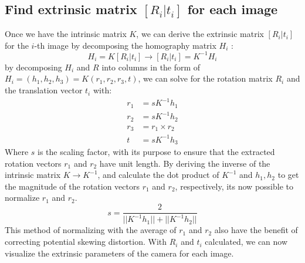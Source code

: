 \documentclass[12pt,letterpaper]{article}
\begin{document}
\subsection{Find extrinsic matrix $[R_i|t_i]$ for each image}
Once we have the intrinsic matrix $K$, we can derive the extrinsic matrix $[R_i|t_i]$ for the $i$-th image by decomposing the homography matrix $H_i$ :
\begin{equation}
    H_i = K[R_i|t_i] \rightarrow [R_i|t_i] = K^{-1}H_i
\end{equation}
by decomposing $H_i$ and $R$ into columns in the form of $H_i = (h_1, h_2, h_3) = K(r_1, r_2, r_3, t)$,
we can solve for the rotation matrix $R_i$ and the translation vector $t_i$ with:
\begin{equation}
    \begin{aligned}
        r_1 & = sK^{-1}h_1 \\ r_2 & = sK^{-1}h_2 \\ r_3 & = r_1 \times r_2 \\ t & = sK^{-1}h_3
    \end{aligned}
\end{equation}
Where $s$ is the scaling factor, with its purpose to ensure that the extracted rotation vectors $r_1$ and $r_2$ have unit length.
By deriving the inverse of the intrinsic matrix $K \rightarrow K^{-1}$, and calculate the dot product of $K^{-1}$ and $h_1, h_2$ to get the magnitude of the rotation vectors $r_1$ and $r_2$, respectively, its now possible to normalize $r_1$ and $r_2$.
\begin{equation}
    s = \frac{2}{||K^{-1}h_1|| + ||K^{-1}h_2||}
\end{equation}
This method of normalizing with the average of $r_1$ and $r_2$ also have the benefit of correcting potential skewing distortion.
With $R_i$ and $t_i$ calculated, we can now visualize the extrinsic parameters of the camera for each image.
\end{document}
